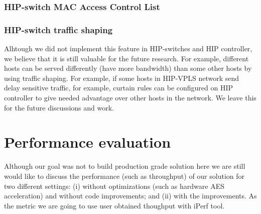 \subsection{HIP-switch MAC Access Control List}
\subsection{HIP-switch traffic shaping}
Alhtough we did not implement this feature in HIP-switches and HIP 
controller, we believe that it is still valuable for the future research.
For example, different hosts can be served differently (have more bandwidth)
than some other hosts by using traffic shaping. For example, if some hosts in HIP-VPLS 
network send delay sensitive traffic, for example, curtain rules can be configured 
on HIP controller to give needed advantage over other hosts in the network. We leave 
this for the future discussions and work.

\chapter{Performance evaluation}
Although our goal was not to build production grade solution
here we are still would like to discuss the performance 
(such as throughput) of our solution for two different settings:
(i) without optimizations (such as hardware AES acceleration) and 
without code improvements; and (ii) with the improvements. As the 
metric we are going to use user obtained thoughput with iPerf tool. 